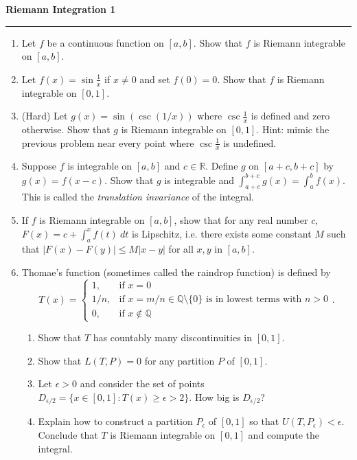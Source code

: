 \documentclass[12pt]{article}
\begin{document}
\begin{center}
{\bf \Large Riemann Integration 1}
\vspace{0.2cm}
\hrule
\end{center}

\begin{enumerate}
	\item Let $f$ be a continuous function on $[a,b]$. Show that $f$ is Riemann integrable on $[a,b]$.
	\vfill
	\item Let $f(x) = \sin \frac{1}{x}$ if $x\neq 0$ and set $f(0) = 0$. Show that $f$ is Riemann integrable on $[0, 1]$.
	\vfill
	\item (Hard) Let $g(x) = \sin(\csc(1/x))$ where $\csc \frac{1}{x}$ is defined and zero otherwise. Show that $g$ is Riemann integrable on $[0,1]$. Hint: mimic the previous problem near every point where $\csc \frac{1}{x}$ is undefined.
	\vfill
	\item Suppose $f$ is integrable on $[a,b]$ and $c\in \mathbb{R}$. Define $g$ on $[a+c, b+c]$ by $g(x) = f(x-c)$. Show that $g$ is integrable and $\int_{a+c}^{b+c}g(x) = \int_a^b f(x)$. This is called the \textit{translation invariance} of the integral.
	\vfill
	\item If $f$ is Riemann integrable on $[a,b]$, show that for any real number $c$, $F(x) = c+\int_a^xf(t)\ dt$ is Lipschitz, i.e. there exists some constant $M$ such that $|F(x)-F(y)|\leq M|x-y|$ for all $x,y$ in $[a,b]$.
	\vfill
	\item Thomae's function (sometimes called the raindrop function) is defined by
	\[
	T(x) = \begin{cases}
		1,&\text{if }x=0\\
		1/n,&\text{if }x=m/n \in \mathbb{Q}\setminus \{0\}\text{ is in lowest terms with }n>0\\
		0,&\text{if }x\notin \mathbb{Q}
	\end{cases}.
	\]
	\begin{enumerate}
		\item Show that $T$ has countably many discontinuities in $[0,1]$.
		\vfill
		\item Show that $L(T, P) = 0$ for any partition $P$ of $[0,1]$.
		\vfill
		\item Let $\epsilon>0$ and consider the set of points $D_{\epsilon/2} = \{x\in [0,1]: T(x)\geq \epsilon>2\}$. How big is $D_{\epsilon/2}$?
		\vfill
		\item Explain how to construct a partition $P_\epsilon$ of $[0,1]$ so that $U(T, P_\epsilon)<\epsilon$. Conclude that $T$ is Riemann integrable on $[0,1]$ and compute the integral.
		\vfill
	\end{enumerate}
\end{enumerate}
\end{document}
